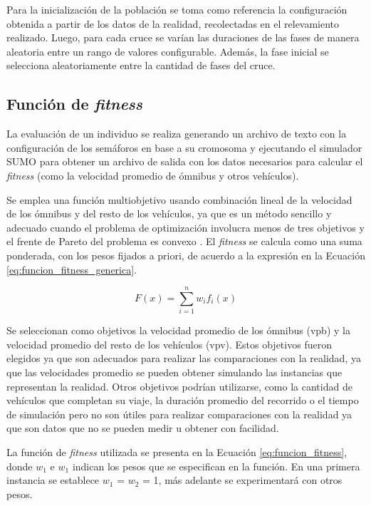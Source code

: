 Para la inicialización de la población se toma como referencia
la configuración obtenida a partir de los datos de la realidad, recolectadas en el relevamiento realizado. Luego, para cada cruce se varían las duraciones de las fases de manera aleatoria entre un rango de valores configurable. Además, la fase inicial se selecciona aleatoriamente entre la cantidad de fases del cruce.

\subsection{Función de \emph{fitness}}


La evaluación de un individuo se realiza generando un archivo de texto con la configuración de los semáforos en base a su cromosoma y ejecutando el simulador SUMO para obtener un archivo de salida con los datos necesarios para calcular el \emph{fitness} (como la velocidad promedio de ómnibus y otros vehículos).

Se emplea una función multiobjetivo usando combinación lineal de la velocidad de los ómnibus y del resto de los vehículos, ya que es un método sencillo y adecuado cuando el problema de optimización involucra menos de tres objetivos y el frente de Pareto del problema es convexo \citep{coello2002evolutionary}. El \emph{fitness} se calcula como una suma ponderada, con los pesos fijados a priori, de acuerdo a la expresión en la Ecuación \ref{eq:funcion_fitness_generica}.

\begin{equation}
\label{eq:funcion_fitness_generica}
F(x) = \sum_{i=1}^{n}{w_i}{f_i}(x)
\end{equation}

Se seleccionan como objetivos la velocidad promedio de los ómnibus (vpb) y la velocidad promedio del resto de los vehículos (vpv). Estos objetivos fueron elegidos ya que son  adecuados para realizar las comparaciones con la realidad, ya que las velocidades promedio se pueden obtener simulando las instancias que representan la realidad. Otros objetivos podrían utilizarse, como la cantidad de vehículos que completan su viaje, la duración promedio del recorrido o el tiempo de simulación pero no son útiles para realizar comparaciones con la realidad ya que son datos que no se pueden medir u obtener con facilidad.

La función de \emph{fitness} utilizada se presenta en la Ecuación \ref{eq:funcion_fitness}, donde \emph{$w_1$} e \emph{$w_1$} indican los pesos que se especifican en la función. En una primera instancia se establece $w_1$ = $w_2$ = 1, más adelante se experimentará con otros pesos.

